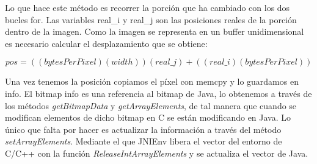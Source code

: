 Lo que hace este método es recorrer la porción que ha cambiado con los dos bucles for. Las variables real\_i y real\_j son las posiciones reales de la porción dentro de la imagen. Como la imagen se representa en un buffer unidimensional es necesario calcular el desplazamiento que se obtiene:

\begin{equation*}
pos = ((bytesPerPixel)(width))(real\_j)+((real\_i)(bytesPerPixel))
\end{equation*}

Una vez tenemos la posición copiamos el píxel con memcpy y lo guardamos en info. El bitmap info es una referencia al bitmap de Java, lo obtenemos a través de los métodos \emph{getBitmapData} y \emph{getArrayElements}, de tal manera que cuando se modifican elementos de dicho bitmap en C se están modificando en Java. Lo único que falta por hacer es actualizar la información a través del método \emph{setArrayElements}. Mediante el que JNIEnv libera el vector del entorno de C/C++ con la función  \emph{ReleaseIntArrayElements} y se actualiza el vector de Java. 
